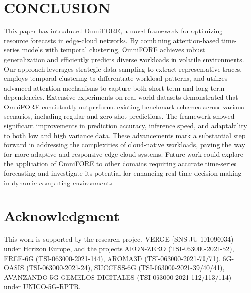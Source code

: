 \documentclass{ieeetmlcn}
\begin{document}

\maketitle







\section*{CONCLUSION}
\label{sec: Conclusion}
This paper has introduced OmniFORE, a novel framework for optimizing resource forecasts in edge-cloud networks. By combining attention-based time-series models with temporal clustering, OmniFORE achieves robust generalization and efficiently predicts diverse workloads in volatile environments. Our approach leverages strategic data sampling to extract representative traces, employs temporal clustering to differentiate workload patterns, and utilizes advanced attention mechanisms to capture both short-term and long-term dependencies. Extensive experiments on real-world datasets demonstrated that OmniFORE consistently outperforms existing benchmark schemes across various scenarios, including regular and zero-shot predictions. The framework showed significant improvements in prediction accuracy, inference speed, and adaptability to both low and high variance data. These advancements mark a substantial step forward in addressing the complexities of cloud-native workloads, paving the way for more adaptive and responsive edge-cloud systems. Future work could explore the application of OmniFORE to other domains requiring accurate time-series forecasting and investigate its potential for enhancing real-time decision-making in dynamic computing environments.

\section*{Acknowledgment}
This work is supported by the research project VERGE (SNS-JU-101096034) under Horizon Europe, and the projects AEON-ZERO (TSI-063000-2021-52), FREE-6G (TSI-063000-2021-144), AROMA3D (TSI-063000-2021-70/71), 6G-OASIS (TSI-063000-2021-24), SUCCESS-6G (TSI-063000-2021-39/40/41), AVANZANDO-5G-GEMELOS DIGITALES (TSI-063000-2021-112/113/114) under UNICO-5G-RPTR.



\vfill\pagebreak
\end{document}
